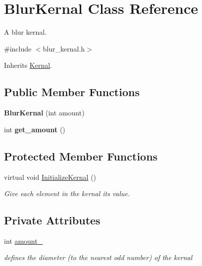 \hypertarget{classBlurKernal}{}\section{Blur\+Kernal Class Reference}
\label{classBlurKernal}


A blur kernal.  




{\ttfamily \#include $<$blur\+\_\+kernal.\+h$>$}



Inherits \hyperlink{classKernal}{Kernal}.

\subsection*{Public Member Functions}
\begin{DoxyCompactItemize}
\item 
{\bfseries Blur\+Kernal} (int amount)\hypertarget{classBlurKernal_ad3a9234c7fe9fb3e20f2a8a06cb11a99}{}\label{classBlurKernal_ad3a9234c7fe9fb3e20f2a8a06cb11a99}

\item 
int {\bfseries get\+\_\+amount} ()\hypertarget{classBlurKernal_aa8b0ab040be4792fe5e617361576b0ee}{}\label{classBlurKernal_aa8b0ab040be4792fe5e617361576b0ee}

\end{DoxyCompactItemize}
\subsection*{Protected Member Functions}
\begin{DoxyCompactItemize}
\item 
virtual void \hyperlink{classBlurKernal_a18f4bbb753d71550078700684295f9b0}{Initialize\+Kernal} ()
\begin{DoxyCompactList}\small\item\em Give each element in the kernal it\textquotesingle{}s value. \end{DoxyCompactList}\end{DoxyCompactItemize}
\subsection*{Private Attributes}
\begin{DoxyCompactItemize}
\item 
int \hyperlink{classBlurKernal_a968c9c6c9093bf678ee38c2440518523}{amount\+\_\+}\hypertarget{classBlurKernal_a968c9c6c9093bf678ee38c2440518523}{}\label{classBlurKernal_a968c9c6c9093bf678ee38c2440518523}

\begin{DoxyCompactList}\small\item\em defines the diameter (to the nearest odd number) of the kernal \end{DoxyCompactList}\end{DoxyCompactItemize}


